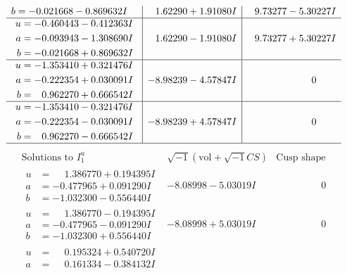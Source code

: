 \documentclass[1p]{elsarticle_modified}
\theoremstyle{definition}
\newcommand{\I}{\sqrt{-1}}
\begin{document}
$$\begin{array}{c|c|c}
\begin{aligned}
b &= -0.021668 - 0.869632 I\end{aligned}
 & \phantom{-}1.62290 + 1.91080 I & \phantom{-}9.73277 - 5.30227 I \\ \hline\begin{aligned}
u &= -0.460443 - 0.412363 I \\
a &= -0.093943 - 1.308690 I \\
b &= -0.021668 + 0.869632 I\end{aligned}
 & \phantom{-}1.62290 - 1.91080 I & \phantom{-}9.73277 + 5.30227 I \\ \hline\begin{aligned}
u &= -1.353410 + 0.321476 I \\
a &= -0.222354 + 0.030091 I \\
b &= \phantom{-}0.962270 + 0.666542 I\end{aligned}
 & -8.98239 - 4.57847 I & \phantom{-0.000000 } 0 \\ \hline\begin{aligned}
u &= -1.353410 - 0.321476 I \\
a &= -0.222354 - 0.030091 I \\
b &= \phantom{-}0.962270 - 0.666542 I\end{aligned}
 & -8.98239 + 4.57847 I & \phantom{-0.000000 } 0\\
 \hline 
 \end{array}$$\newpage$$\begin{array}{c|c|c}  
\text{Solutions to }I^u_{1}& \I (\text{vol} + \sqrt{-1}CS) & \text{Cusp shape}\\
 \hline 
\begin{aligned}
u &= \phantom{-}1.386770 + 0.194395 I \\
a &= -0.477965 + 0.091290 I \\
b &= -1.032300 - 0.556440 I\end{aligned}
 & -8.08998 - 5.03019 I & \phantom{-0.000000 } 0 \\ \hline\begin{aligned}
u &= \phantom{-}1.386770 - 0.194395 I \\
a &= -0.477965 - 0.091290 I \\
b &= -1.032300 + 0.556440 I\end{aligned}
 & -8.08998 + 5.03019 I & \phantom{-0.000000 } 0 \\ \hline\begin{aligned}
u &= \phantom{-}0.195324 + 0.540720 I \\
a &= \phantom{-}0.161334 - 0.384132 I \\

\end{aligned}
\end{array}$$
\end{document}
